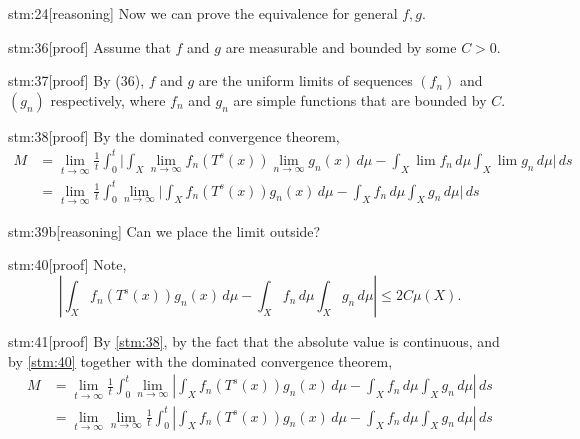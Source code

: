 \begin{stm}{stm:24}[reasoning]
Now we can prove the equivalence for general $f, g$.
\end{stm}

\begin{stm}{stm:36}[proof]
Assume that $f$ and $g$ are measurable and bounded by some $C > 0$. 
\end{stm}

\begin{stm}{stm:37}[proof]
By (36), $f$ and $g$ are the uniform limits of sequences $(f_n)$ and $(g_n)$ respectively, where $f_n$ and $g_n$ are simple functions that are bounded by $C$.
\end{stm}

\begin{stm}{stm:38}[proof]
By the dominated convergence theorem,
\begin{align*}
M &= \lim_{t \to \infty} \frac{1}{t} \int_0^t 
\Big| \int_X \lim_{n \to \infty} f_n(T^s(x)) \lim_{n \to \infty} g_n(x) \, d\mu 
- \int_X \lim f_n \, d\mu \int_X \lim g_n \, d\mu \Big| \, ds \\
&= \lim_{t \to \infty} \frac{1}{t} \int_0^t 
\lim_{n \to \infty} 
\Big| \int_X f_n(T^s(x)) g_n(x) \, d\mu 
- \int_X f_n \, d\mu \int_X g_n \, d\mu \Big| \, ds
\end{align*}
\end{stm}

\begin{stm}{stm:39b}[reasoning]
Can we place the limit outside?
\end{stm}

\begin{stm}{stm:40}[proof]
Note,
\[
\left| \int_X f_n(T^s(x)) g_n(x) \, d\mu 
- \int_X f_n \, d\mu \int_X g_n \, d\mu \right| \leq 2C \mu(X).
\]

\end{stm}

\begin{stm}{stm:41}[proof]
By \ref{stm:38}, by the fact that the absolute value is continuous, and by \ref{stm:40} together with the  dominated convergence theorem,
\begin{align*}
M
&= \lim_{t \to \infty} \frac{1}{t} \int_0^t 
\lim_{n \to \infty} 
\left| \int_X f_n(T^s(x)) g_n(x) \, d\mu 
- \int_X f_n \, d\mu \int_X g_n \, d\mu \right| \, ds \\
&= \lim_{t \to \infty} \lim_{n \to \infty} \frac{1}{t} \int_0^t 
\left| \int_X f_n(T^s(x)) g_n(x) \, d\mu 
- \int_X f_n \, d\mu \int_X g_n \, d\mu \right| \, ds
\end{align*}
\end{stm}

